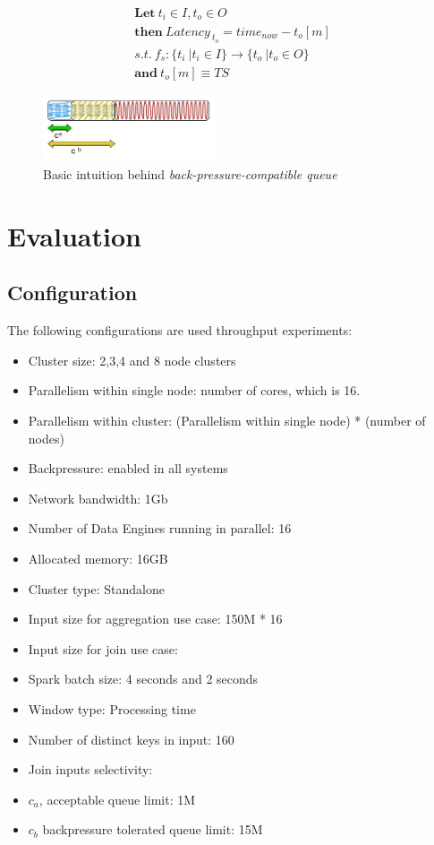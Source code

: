 \documentclass{vldb}
\begin{document}
   \begin{equation}
     \begin{gathered}
  \textbf{Let} \ t_{i} \in I , t_{o} \in O \\
\textbf{then} \ Latency_{ \ t_{o}} = time_{now} -  t_{o}[m] \\
s.t. \ f_{s}:\{t_{i} \ | t_{i} \in I \} \to \{t_{o} \ | t_{o} \in O \} \\
\textbf{and} \ t_{o}[m] \equiv TS
  \end{gathered}
  \label{eq_2} 
\end{equation}



\begin{figure}[h]
\centering
\includegraphics[width=0.45\textwidth]{queue}
\caption{Basic intuition behind \textit{back-pressure-compatible queue}}
\label{fig_queue}
\end{figure}


\section{Evaluation}
\subsection{Configuration}
The following configurations are used throughput experiments:
\begin{itemize}
\item Cluster size: 2,3,4 and 8 node clusters
\item Parallelism within single node: number of cores, which is 16.
\item Parallelism within cluster: (Parallelism within single node) * (number of nodes)

\item Backpressure: enabled in all systems
\item Network bandwidth: 1Gb
\item Number of Data Engines running in parallel: 16
\item Allocated memory: 16GB
\item Cluster type: Standalone
\item Input size for aggregation use case: 150M * 16
\item Input size for join use case: 
\item Spark batch size: 4 seconds and 2 seconds
\item Window type: Processing time
\item Number of distinct keys in input: 160
\item Join inputs selectivity: 
\item $c_{a}$, acceptable queue limit: 1M
\item $c_{b}$ backpressure tolerated queue limit: 15M
\end{itemize}
\end{document}

